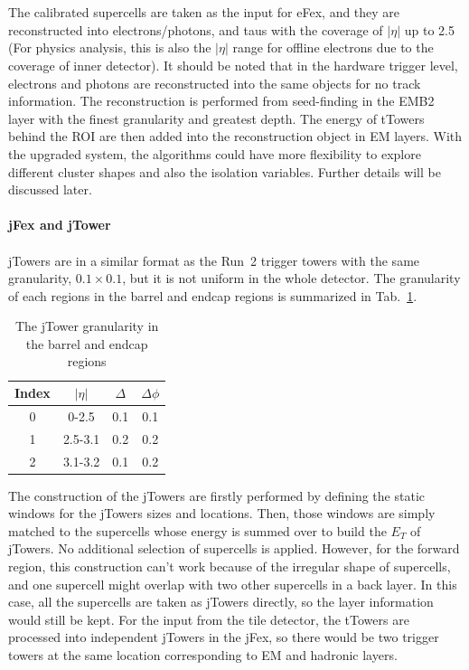 \noindent
\\
\\The calibrated supercells are taken as the input for eFex, and they are reconstructed into electrons/photons, and taus with the coverage of $|\eta|$ up to 2.5 (For physics analysis, this is also the $|\eta|$ range for offline electrons due to the coverage of inner detector). It should be noted that in the hardware trigger level, electrons and photons are reconstructed into the same objects for no track information. The reconstruction is performed from seed-finding in the EMB2 layer with the finest granularity and greatest depth. The energy of tTowers behind the ROI are then added into the reconstruction object in EM layers. With the upgraded system, the algorithms could have more flexibility to explore different cluster shapes and also the isolation variables. Further details will be discussed later. 
\\
\\{\bf jFex and jTower}
\\
\\jTowers are in a similar format as the Run~2 trigger towers with the same granularity, $0.1\times0.1$, but it is not uniform in the whole detector. The granularity of each regions in the barrel and endcap regions is summarized in Tab.~\ref{Tab:granularity_jT}.
\begin{table}[h]
	\caption{The jTower granularity in the barrel and endcap regions}
	\renewcommand{\arraystretch}{1.3}
	\centering
	\begin{tabular}{| c | c | c | c | }
		\hline
		\hline
		Index      &    $|\eta|$        &     $\Delta$     & $\Delta\phi$   \\
		\hline
		0          &     0-2.5          & 0.1                          &  0.1                          \\
		\hline
		1          &     2.5-3.1           & 0.2                          &  0.2                         \\
		\hline
		2      &     3.1-3.2       & 0.1                       &  0.2                       \\
		\hline
		\hline
	\end{tabular}
	\label{Tab:granularity_jT}
\end{table}
\noindent
The construction of the jTowers are firstly performed by defining the static windows for the jTowers sizes and locations. Then, those windows are simply matched to the supercells whose energy is summed over to build the $E_{T}$ of jTowers. No additional selection of supercells is applied. However, for the forward region, this construction can't work because of the irregular shape of supercells, and one supercell might overlap with two other supercells in a back layer. In this case, all the supercells are taken as jTowers directly, so the layer information would still be kept. For the input from the tile detector, the tTowers are processed into independent jTowers in the jFex, so there would be two trigger towers at the same location corresponding to EM and hadronic layers. 
